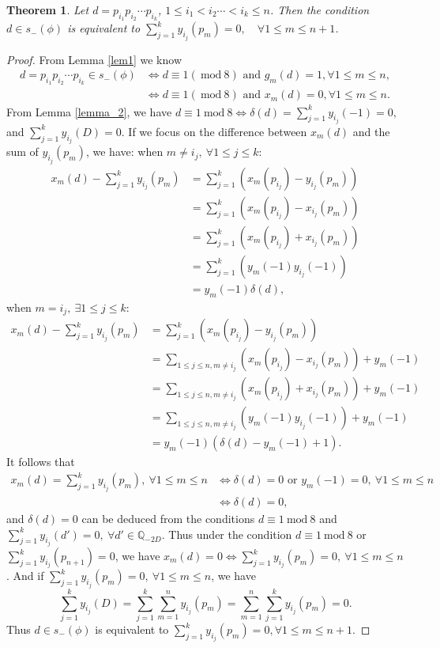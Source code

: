 \documentclass{amsart}
\numberwithin{equation}{section}
\theoremstyle{plain}
\newtheorem{thm_}[equation]{Theorem}
\theoremstyle{definition}
\newcommand{\thm}[1]{\begin{thm_}#1\end{thm_}}
\newcommand{\pf}[1]{\begin{proof}#1\end{proof}}
\newcommand{\QQ}{\mathbb Q}
\renewcommand{\mod}[1]{\ \mathrm{mod}\ #1}  %
\begin{document}
\thm{\label{thm1}Let $d = p_{i_1}p_{i_2} \cdots p_{i_k}$, $1 \le i_1 < i_2 \cdots < i_k \le n$. Then the condition $d \in s_-(\phi)$ is equivalent to $ \sum\limits_{j=1}^k y_{i_j}(p_m) = 0,\quad \forall 1 \le m \le n+1$.}
\pf{From Lemma \ref{lem1} we know
$$
\begin{aligned}
d = p_{i_1}p_{i_2} \cdots p_{i_k}  \in s_-(\phi) & \Leftrightarrow d \equiv 1 (\mod 8) \text{ and }  g_{m}(d) = 1, \forall 1\leq m \leq n, \\
&\Leftrightarrow d \equiv 1 (\mod 8) \text{ and } x_{m}(d) = 0, \forall 1\leq m \leq n .
\end{aligned}
$$
From Lemma \ref{lemma_2}, we have $d \equiv 1 \mod 8 \Leftrightarrow \delta(d) = \sum\limits_{j = 1}^k y_{i_j}(-1) = 0,$ and $\sum\limits_{j = 1}^k y_{i_j}(D) = 0$.
If we focus on the difference between $x_m(d)$ and the sum of $y_{i_j}(p_m)$, we have:
when $m \neq i_j, \ \forall 1 \le j \le k$:
	$$
	\begin{aligned}
	x_m(d) - \sum\limits_{j=1}^k y_{i_j}(p_m) & = \sum\limits_{j=1}^k (x_m(p_{i_j}) - y_{i_j}(p_m))\\
	& = \sum\limits_{j=1}^k (x_m(p_{i_j}) - x_{i_j}(p_m))\\
	& = \sum\limits_{j=1}^k (x_m(p_{i_j}) + x_{i_j}(p_m))\\
	& = \sum\limits_{j=1}^k (y_m(-1) y_{i_j}(-1))\\
	& = y_m(-1)\delta(d),
	\end{aligned}
	$$
when $ m = i_j, \ \exists 1 \le j \le k $:
	$$
	\begin{aligned}
	x_m(d) - \sum\limits_{j=1}^k y_{i_j}(p_m) & = \sum\limits_{j=1}^k (x_m(p_{i_j}) - y_{i_j}(p_m))\\
	& = \sum\limits_{1 \le j \le n ,m \neq i_j} (x_m(p_{i_j}) - x_{i_j}(p_m)) + y_{m}(-1)\\
	& = \sum\limits_{1 \le j \le n ,m \neq i_j} (x_m(p_{i_j}) + x_{i_j}(p_m))+ y_{m}(-1)\\
	& = \sum\limits_{1 \le j \le n ,m \neq i_j} (y_m(-1) y_{i_j}(-1)) + y_{m}(-1)\\
	& = y_m(-1)(\delta(d) - y_m(-1) + 1).
	\end{aligned}
	$$
It follows that
$$
\begin{aligned}
x_m(d) = \sum\limits_{j=1}^k y_{i_j}(p_m),\  \forall 1 \le m \le n & \Leftrightarrow \delta(d) = 0 \text{ or } y_m(-1) = 0,\  \forall 1 \le m \le n \\
& \Leftrightarrow \delta(d) = 0,
\end{aligned}
$$
and $\delta(d) = 0$ can be deduced from the conditions $d \equiv 1 \mod 8$ and $\sum\limits_{j=1}^k y_{i_j}(d') = 0, \ \forall d' \in \QQ_{-2D}$. Thus under the condition  $d \equiv 1 \mod 8$ or $\sum\limits_{j=1}^k y_{i_j}(p_{n+1}) = 0$, we have $x_m(d) = 0 \Leftrightarrow \sum\limits_{j=1}^k y_{i_j}(p_m) = 0,\  \forall 1 \le m \le n$.
And if $\sum\limits_{j=1}^k y_{i_j}(p_m) = 0,\  \forall 1 \le m \le n$, we have $$\sum\limits_{j = 1}^k y_{i_j}(D) = \sum\limits_{j = 1}^k \sum\limits_{m = 1}^n y_{i_j}(p_m) = \sum\limits_{m = 1}^n \sum\limits_{j = 1}^k y_{i_j}(p_m)= 0 .$$
Thus $d \in s_-(\phi)$ is equivalent to $ \sum\limits_{j=1}^k y_{i_j}(p_m) = 0, \forall 1 \le m \le n+1$.
}
\end{document}
